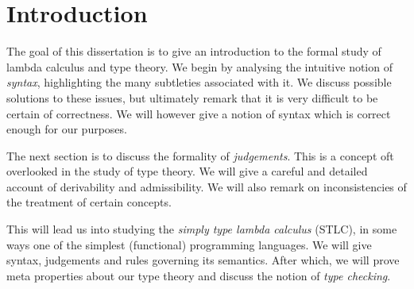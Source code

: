 \begin{comment}
\section{Introduction}

The goal of this thesis is to introduce dependent types to the undergraduate reader. We set out 

The goal of this dissertation is to learn how to mathematically design a programming language. 


The aim of this thesis is to introduce the notion of dependent types to an undergraduate reader. The main idea of dependent types is very simple, yet deceptively subtle however, since modelling such a formalism is quite tricky. This is evidenced by the fact that there is a lot of disagreement in type theory what has or hasn't been proven. This however is a familiar story in mathematics and is usually remedied by trying to understand what has been done better. Usually with the help of a new perspective. 

Dependent types however, are not only of interest to mathematicians but also programmers. Dependent type theory (much like simply typed lambda calculus) is very much a programming language allowing the expression of ideas previously too difficult to express. This is very much facilitated by its deep connection to predicate logic.
\end{comment}

\section{Introduction}

The goal of this dissertation is to give an introduction to the formal study of lambda calculus and type theory. We begin by analysing the intuitive notion of \emph{syntax}, highlighting the many subtleties associated with it. We discuss possible solutions to these issues, but ultimately remark that it is very difficult to be certain of correctness. We will however give a notion of syntax which is correct enough for our purposes.

The next section is to discuss the formality of \emph{judgements}. This is a concept oft overlooked in the study of type theory. We will give a careful and detailed account of derivability and admissibility. We will also remark on inconsistencies of the treatment of certain concepts.

This will lead us into studying the \emph{simply type lambda calculus} (STLC), in some ways one of the simplest (functional) programming languages. We will give syntax, judgements and rules governing its semantics. After which, we will prove meta properties about our type theory and discuss the notion of \emph{type checking}.

